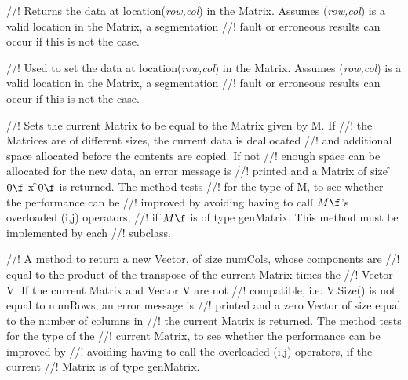 //! Returns the data at location({\em row,col}) in the Matrix. Assumes
({\em row,col}) is a valid location in the Matrix, a segmentation
//! fault or erroneous results can occur if this is not the case.

//! Used to set the data at location({\em row,col}) in the Matrix. Assumes
({\em row,col}) is a valid location in the Matrix, a segmentation
//! fault or erroneous results can occur if this is not the case.


//! Sets the current Matrix to be equal to the Matrix given by \p M. If
//! the Matrices are of different sizes, the current data is deallocated
//! and additional space allocated before the contents are copied. If not
//! enough space can be allocated for the new data, an error message is
//! printed and a Matrix of size \f$0\f$ x \f$0\f$ is returned. The method tests
//! for the type of \p M, to see whether the performance can be
//! improved by avoiding having to call \f$M\f$'s overloaded (i,j) operators,
//! if \f$M\f$ is of type genMatrix. This method must be implemented by each
//! subclass. 











//! A method to return a new Vector, of size numCols, whose components are
//! equal to the product of the transpose of the current Matrix times the
//! Vector \p V. If the current Matrix and Vector \p V are not
//! compatible, i.e. V.Size() is not equal to numRows, an error message is
//! printed and a zero Vector of size equal to the number of columns in
//! the current Matrix is returned. The method tests for the type of the
//! current Matrix, to see whether the performance can be improved by
//! avoiding having to call the overloaded (i,j) operators, if the current
//! Matrix is of type genMatrix. 

